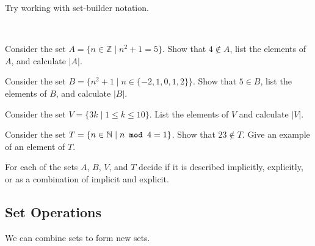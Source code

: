 Try working with set-builder notation.

\begin{act}
\label{act_set_builder_notation}
~
    \begin{actpart}
        \item Consider the set $A = \{ n \in \mathbb{Z} \mid n^2+1=5\}$.  Show that $4 \notin A$, list the elements of $A$, and calculate $|A|$. 
        \item Consider the set $B= \{n^2+1 \mid n \in \{-2,1,0,1,2\}\}$.  Show that $5 \in B$, list the elements of $B$, and calculate $|B|$.
        \item Consider the set $V = \{ 3k \mid 1 \le k \le 10\}$. List the elements of $V$ and calculate $|V|$.
        \item Consider the set 
        $T = \{ n \in \mathbb{N} \mid n \texttt{~mod~} 4 = 1\}$.  Show that $23 \notin T$.  Give an example of an element of $T$. 
        \item For each of the sets $A$, $B$, $V$, and $T$ decide if it is described implicitly, explicitly, or as a combination of implicit and explicit.
    \end{actpart}
\end{act}


\newcommand{\subsetops}{Set Operations}
\subsection{\subsetops}
\label{sub_set_operations}

We can combine sets to form new sets.

